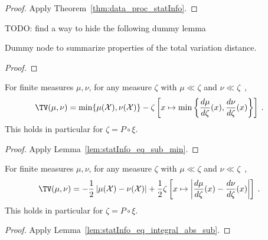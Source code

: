 \begin{proof}\leanok
{}
Apply Theorem~\ref{thm:data_proc_statInfo}.
\end{proof}


TODO: find a way to hide the following dummy lemma
\begin{lemma}
  \label{lem:tv_properties}
  \leanok
  Dummy node to summarize properties of the total variation distance.
\end{lemma}

\begin{proof}\leanok
{}
\end{proof}


\begin{lemma}
  \label{lem:tv_eq_sub_min}
  For finite measures $\mu, \nu$, for any measure $\zeta$ with $\mu \ll \zeta$ and $\nu \ll \zeta$~,
  \begin{align*}
  \TV(\mu, \nu)
  &= \min\{\mu(\mathcal X), \nu(\mathcal X)\} - \zeta\left[x \mapsto \min \left\{\frac{d \mu}{d\zeta}(x), \frac{d \nu}{d\zeta}(x)\right\}\right]
  \: .
  \end{align*}
  This holds in particular for $\zeta = P \circ \xi$.
\end{lemma}

\begin{proof}%
{}
Apply Lemma~\ref{lem:statInfo_eq_sub_min}.
\end{proof}


\begin{lemma}
  \label{lem:tv_eq_integral_abs_sub}
  For finite measures $\mu, \nu$, for any measure $\zeta$ with $\mu \ll \zeta$ and $\nu \ll \zeta$~,
  \begin{align*}
  \TV(\mu, \nu)
  &= - \frac{1}{2} \left\vert \mu(\mathcal X) - \nu(\mathcal X) \right\vert + 
  \frac{1}{2} \zeta\left[x \mapsto \left\vert \frac{d \mu}{d\zeta}(x) - \frac{d \nu}{d\zeta}(x)\right\vert\right] 
  \: .
  \end{align*}
  This holds in particular for $\zeta = P \circ \xi$.
\end{lemma}

\begin{proof}%
{}
Apply Lemma~\ref{lem:statInfo_eq_integral_abs_sub}.
\end{proof}


